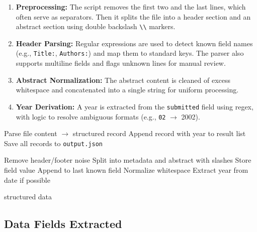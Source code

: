 \documentclass[12pt]{article}
\begin{document}
\begin{enumerate}
    \item \textbf{Preprocessing:} The script removes the first two and the last lines, which often serve as separators. Then it splits the file into a header section and an abstract section using double backslash \texttt{\textbackslash\textbackslash} markers.

    \item \textbf{Header Parsing:} Regular expressions are used to detect known field names (e.g., \texttt{Title:}, \texttt{Authors:}) and map them to standard keys. The parser also supports multiline fields and flags unknown lines for manual review.

    \item \textbf{Abstract Normalization:} The abstract content is cleaned of excess whitespace and concatenated into a single string for uniform processing.

    \item \textbf{Year Derivation:} A year is extracted from the \texttt{submitted} field using regex, with logic to resolve ambiguous formats (e.g., \texttt{02} $\rightarrow$ 2002).
\end{enumerate}

\begin{algorithmic}[1]
            \State Parse file content $\rightarrow$ structured record
            \State Append record with year to result list
        \EndFor
    \EndFor
    \State Save all records to \texttt{output.json}
\end{algorithmic}

\vspace{1em}

\begin{algorithmic}[1]

    \State Remove header/footer noise
    \State Split into metadata and abstract with slashes
            \State Store field value
        \Else
            \State Append to last known field
        \EndIf
    \EndFor
    \State Normalize whitespace
    \State Extract year from date if possible
    
    \Return structured data
\end{algorithmic}

\subsection{Data Fields Extracted}
\end{document}
